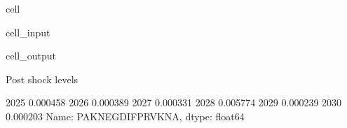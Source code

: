 \documentclass[letterpaper,10pt,english]{jupyterBook}
\begin{document}
\begin{sphinxuseclass}{cell}\begin{sphinxVerbatimInput}

\begin{sphinxuseclass}{cell_input}
\begin{sphinxVerbatim}[commandchars=\\\{\}]

\PYG{p}{[}\PYG{p}{]}
\end{sphinxVerbatim}

\end{sphinxuseclass}\end{sphinxVerbatimInput}
\begin{sphinxVerbatimOutput}

\begin{sphinxuseclass}{cell_output}
\begin{sphinxVerbatim}[commandchars=\\\{\}]
Post shock levels
\end{sphinxVerbatim}

\begin{sphinxVerbatim}[commandchars=\\\{\}]
2025   \PYGZhy{}0.000458
2026   \PYGZhy{}0.000389
2027   \PYGZhy{}0.000331
2028    0.005774
2029   \PYGZhy{}0.000239
2030   \PYGZhy{}0.000203
Name: PAKNEGDIFPRVKN\PYGZus{}A, dtype: float64
\end{sphinxVerbatim}

\end{sphinxuseclass}\end{sphinxVerbatimOutput}

\end{sphinxuseclass}
\end{document}
